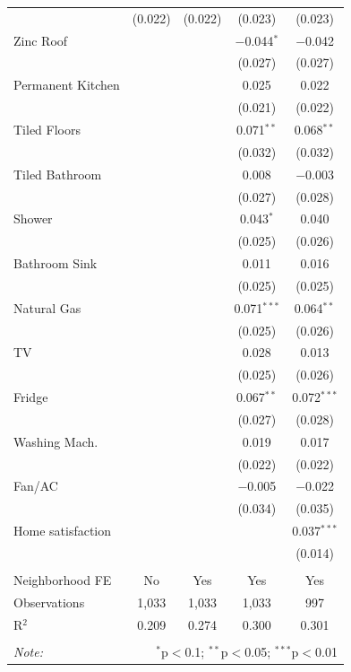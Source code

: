 \begin{table}[H]
\begin{tabular}{@{\extracolsep{-7pt}}lcccc}
  & (0.022) & (0.022) & (0.023) & (0.023) \\ 
  Zinc Roof &  &  & $-$0.044$^{*}$ & $-$0.042 \\ 
  &  &  & (0.027) & (0.027) \\ 
  Permanent Kitchen &  &  & 0.025 & 0.022 \\ 
  &  &  & (0.021) & (0.022) \\ 
  Tiled Floors &  &  & 0.071$^{**}$ & 0.068$^{**}$ \\ 
  &  &  & (0.032) & (0.032) \\ 
  Tiled Bathroom &  &  & 0.008 & $-$0.003 \\ 
  &  &  & (0.027) & (0.028) \\ 
  Shower &  &  & 0.043$^{*}$ & 0.040 \\ 
  &  &  & (0.025) & (0.026) \\ 
  Bathroom Sink &  &  & 0.011 & 0.016 \\ 
  &  &  & (0.025) & (0.025) \\ 
  Natural Gas &  &  & 0.071$^{***}$ & 0.064$^{**}$ \\ 
  &  &  & (0.025) & (0.026) \\ 
  TV &  &  & 0.028 & 0.013 \\ 
  &  &  & (0.025) & (0.026) \\ 
  Fridge &  &  & 0.067$^{**}$ & 0.072$^{***}$ \\ 
  &  &  & (0.027) & (0.028) \\ 
  Washing Mach. &  &  & 0.019 & 0.017 \\ 
  &  &  & (0.022) & (0.022) \\ 
  Fan/AC &  &  & $-$0.005 & $-$0.022 \\ 
  &  &  & (0.034) & (0.035) \\ 
  Home satisfaction &  &  &  & 0.037$^{***}$ \\ 
  &  &  &  & (0.014) \\ 
 \hline \\[-1.8ex] 
Neighborhood FE & No & Yes & Yes & Yes \\ 
Observations & 1,033 & 1,033 & 1,033 & 997 \\ 
R$^{2}$ & 0.209 & 0.274 & 0.300 & 0.301 \\ 
\hline 
\hline \\[-1.8ex] 
\textit{Note:}  & \multicolumn{4}{r}{$^{*}$p$<$0.1; $^{**}$p$<$0.05; $^{***}$p$<$0.01} \\ 
\end{tabular} 
\end{table} 
